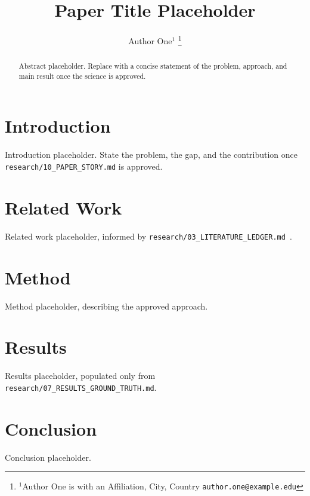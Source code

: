 \documentclass[letterpaper, 10 pt, conference]{ieeeconf}
\title{\LARGE \bf
Paper Title Placeholder
}
\author{Author One$^{1}$
\thanks{$^{1}$Author One is with an Affiliation, City, Country
        {\tt\small author.one@example.edu}}%
}
\begin{document}
\maketitle
\thispagestyle{empty}
\pagestyle{empty}

\begin{abstract}
Abstract placeholder. Replace with a concise statement of the problem,
approach, and main result once the science is approved.
\end{abstract}

\section{Introduction}

Introduction placeholder. State the problem, the gap, and the
contribution once \texttt{research/10\_PAPER\_STORY.md} is approved.

\section{Related Work}

Related work placeholder, informed by
\texttt{research/03\_LITERATURE\_LEDGER.md}~\cite{example2024}.

\section{Method}

Method placeholder, describing the approved approach.

\section{Results}

Results placeholder, populated only from
\texttt{research/07\_RESULTS\_GROUND\_TRUTH.md}.

\section{Conclusion}

Conclusion placeholder.



\end{document}
